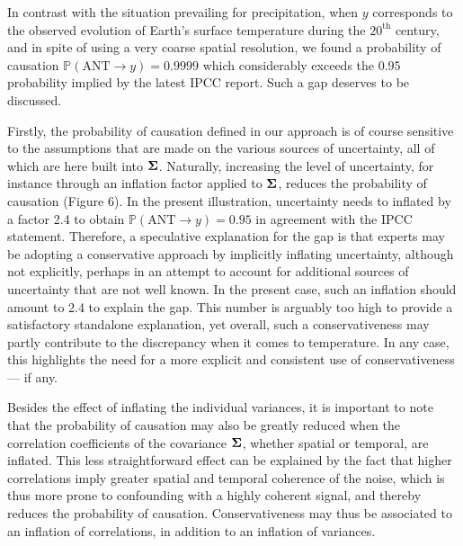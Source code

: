 \documentclass[12pt]{article}
\newcommand{\Sig}{\mbox{\boldmath \(\Sigma\)}}
\newcommand{\Proba}{\mathbb P}
\begin{document}
In contrast with the situation prevailing for precipitation, when $y$ corresponds to the observed evolution of Earth's surface temperature during the $20^{\textrm{th}}$ century, and in spite of using a very coarse spatial resolution, we found a probability of causation $\Proba(\textrm{ANT}\rightarrow y)=0.9999$ which considerably exceeds the $0.95$ probability implied by the latest IPCC report. Such a gap deserves to be discussed. 

Firstly, the probability of causation defined in our approach is of course sensitive to the assumptions that are made on the various sources of uncertainty, all of which are here built into $\Sig$. Naturally, increasing the level of uncertainty, for instance through an inflation factor applied to $\Sig$, reduces the probability of causation (Figure 6). In the present illustration, uncertainty needs to inflated by a factor 2.4 to obtain $\Proba(\textrm{ANT}\rightarrow y)=0.95$ in agreement with the IPCC statement. Therefore, a speculative explanation for the gap is that experts may be adopting a conservative approach by implicitly inflating uncertainty, although not explicitly, perhaps in an attempt to account for additional sources of uncertainty that are not well known. In the present case, such an inflation should amount to 2.4 to explain the gap. This number is arguably too high to provide a satisfactory standalone explanation, yet overall, such a conservativeness may partly contribute to the discrepancy when it comes to temperature. %
In any case, this highlights the need for a more explicit and consistent use of conservativeness --- if any.

Besides the effect of inflating the individual variances, it is important to note that the probability of causation may also be greatly reduced when the correlation coefficients of the covariance $\Sig$, whether spatial or temporal, are inflated. This less straightforward effect can be explained by the fact that higher correlations imply greater spatial and temporal coherence of the noise, which is thus more prone to confounding with a highly coherent signal, and thereby reduces the probability of causation. Conservativeness may thus be associated to an inflation of correlations, in addition to an inflation of variances.
\end{document}
